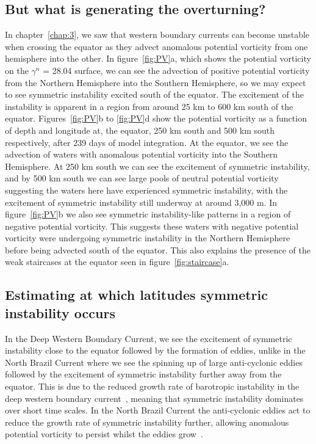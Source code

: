 \subsection{But what is generating the overturning?}
In chapter~\ref{chap:3}, we saw that western boundary currents can become unstable when crossing the equator as they advect anomalous potential vorticity from one hemisphere into the other. In figure~\ref{fig:PV}a, which shows the potential vorticity on the $\gamma^n$ = 28.04 surface, we can see the advection of positive potential vorticity from the Northern Hemisphere into the Southern Hemisphere, so we may expect to see symmetric instability excited south of the equator. The excitement of the instability is apparent in a region from around 25 km to 600 km south of the equator. Figures~\ref{fig:PV}b to \ref{fig:PV}d show the potential vorticity as a function of depth and longitude at, the equator, 250 km south and 500 km south respectively, after 239 days of model integration. At the equator, we see the advection of waters with anomalous potential vorticity into the Southern Hemisphere. At 250 km south we can see the excitement of symmetric instability, and by 500 km south we can see large pools of neutral potential vorticity suggesting the waters here have experienced symmetric instability, with the excitement of symmetric instability still underway at around 3,000 m. In figure~\ref{fig:PV}b we also see symmetric instability-like patterns in a region of negative potential vorticity. This suggests these waters with negative potential vorticity were undergoing symmetric instability in the Northern Hemisphere before being advected south of the equator. This also explains the presence of the weak staircases at the equator seen in figure~\ref{fig:staircase}a.

\subsection{Estimating at which latitudes symmetric instability occurs}
\label{sec:relation2nbc}
In the Deep Western Boundary Current, we see the excitement of symmetric instability close to the equator followed by the formation of eddies, unlike in the North Brazil Current where we see the spinning up of large anti-cyclonic eddies followed by the excitement of symmetric instability further away from the equator. This is due to the reduced growth rate of barotropic instability in the deep western boundary current~\citep{Edwards1998II}, meaning that symmetric instability dominates over short time scales. In the North Brazil Current the anti-cyclonic eddies act to reduce the growth rate of symmetric instability further, allowing anomalous potential vorticity to persist whilst the eddies grow~\citep{Buckingham2021}. 

